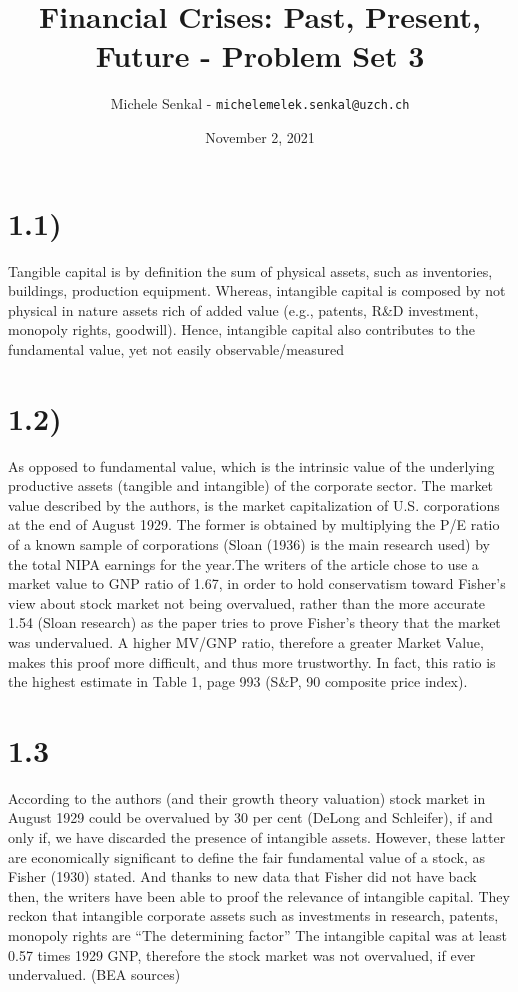 \documentclass[11pt, oneside]{article}   	%
\title{Financial Crises: Past, Present, Future - Problem Set 3}
\author{Michele Senkal - \texttt{michelemelek.senkal@uzch.ch}}
\date{November 2, 2021}							%
\begin{document}
\maketitle

\section*{1.1)}
Tangible capital is by definition the sum of physical assets, such as inventories, buildings, production equipment. Whereas, intangible capital is composed by not physical in nature assets rich of added value (e.g., patents, R&D investment, monopoly rights, goodwill). Hence, intangible capital also contributes to the fundamental value, yet not easily observable/measured

	

\section*{1.2)}
As opposed to fundamental value, which is the intrinsic value of the underlying productive assets (tangible and intangible) of the corporate sector. The market value described by the authors, is the market capitalization of U.S. corporations at the end of August 1929. The former is obtained by multiplying the P/E ratio of a known sample of corporations (Sloan (1936) is the main research used) by the total NIPA earnings for the year.The writers of the article chose to use a market value to GNP ratio of 1.67, in order to hold conservatism toward Fisher’s view about stock market not being overvalued, rather than the more accurate 1.54 (Sloan research) as the paper tries to prove Fisher’s theory that the market was undervalued. A higher MV/GNP ratio, therefore a greater Market Value, makes this proof more difficult, and thus more trustworthy. In fact, this ratio is the highest estimate in Table 1, page 993 (S&P, 90 composite price index).
	

\section*{1.3}
According to the authors (and their growth theory valuation) stock market in August 1929 could be overvalued by 30 per cent (DeLong and Schleifer), if and only if, we have discarded the presence of intangible assets. However, these latter are economically significant to define the fair fundamental value of a stock, as Fisher (1930) stated. And thanks to new data that Fisher did not have back then, the writers have been able to proof the relevance of intangible capital. They reckon that intangible corporate assets such as investments in research, patents, monopoly rights are “The determining factor” The intangible capital was at least 0.57 times 1929 GNP, therefore the stock market was not overvalued, if ever undervalued. (BEA sources)
	
\end{document}
